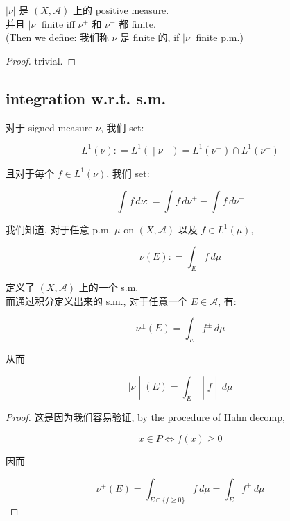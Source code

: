 \begin{lemma}

\(|\nu|\) 是 \((X,\mathcal{A})\) 上的 positive measure.\\
并且 \(|\nu|\) finite iff \(\nu^{+}\) 和 \(\nu^{-}\) 都 finite.\\
(Then we define: 我们称 \(\nu\) 是 finite 的, if \(|\nu|\) finite p.m.)

\end{lemma}

\begin{proof}

trivial.

\end{proof}

\subsection{integration w.r.t. s.m.}\label{integration-w.r.t.-s.m.}

\begin{definition}{}

对于 signed measure \(\nu\), 我们 set:

\[\left. L^{1}(\nu): = L^{1}( \middle| \nu \middle| ) = L^{1}(\nu^{+}) \cap L^{1}(\nu^{-}) \right.\]

且对于每个 \(f \in L^{1}(\nu)\), 我们 set:

\[\int f\, d\nu: = \int f\, d\nu^{+} - \int f\, d\nu^{-}\]

\end{definition}

\begin{proposition}

我们知道, 对于任意 p.m. \(\mu\) on \((X,\mathcal{A})\) 以及 \(f \in L^{1}(\mu)\),

\[\nu(E): = \int_{E}f\, d\mu\]

定义了 \((X,\mathcal{A})\) 上的一个 s.m.\\
而通过积分定义出来的 s.m., 对于任意一个 \(E \in \mathcal{A}\), 有:

\[\nu^{\pm}(E) = \int_{E}f^{\pm}\, d\mu\]

从而

\[\left. |\nu \middle| (E) = \int_{E} \middle| f \middle| \, d\mu \right.\]

\end{proposition}

\begin{proof}

这是因为我们容易验证, by the procedure of Hahn decomp,

\[x \in P\Leftrightarrow f(x) \geq 0\]

因而

\[\nu^{+}(E) = \int_{E \cap {\{{f \geq 0}\}}}f\, d\mu = \int_{E}f^{+}\, d\mu\]

\end{proof}

